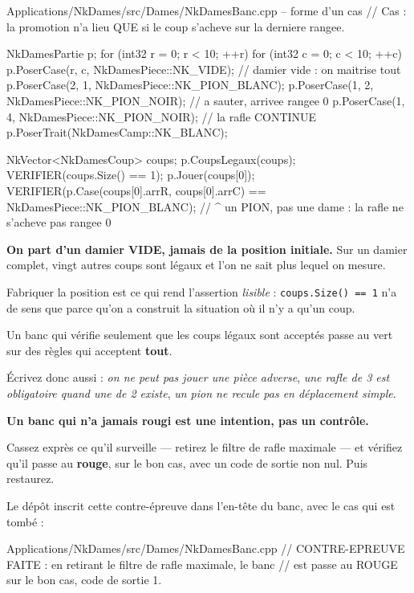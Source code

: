 \begin{nkcode}{Applications/NkDames/src/Dames/NkDamesBanc.cpp -- forme d'un cas}
// Cas : la promotion n'a lieu QUE si le coup s'acheve sur la derniere rangee.
{
    NkDamesPartie p;
    for (int32 r = 0; r < 10; ++r)
        for (int32 c = 0; c < 10; ++c)
            p.PoserCase(r, c, NkDamesPiece::NK_VIDE);   // damier vide : on maitrise tout
    p.PoserCase(2, 1, NkDamesPiece::NK_PION_BLANC);
    p.PoserCase(1, 2, NkDamesPiece::NK_PION_NOIR);      // a sauter, arrivee rangee 0
    p.PoserCase(1, 4, NkDamesPiece::NK_PION_NOIR);      // la rafle CONTINUE
    p.PoserTrait(NkDamesCamp::NK_BLANC);

    NkVector<NkDamesCoup> coups;
    p.CoupsLegaux(coups);
    VERIFIER(coups.Size() == 1);
    p.Jouer(coups[0]);
    VERIFIER(p.Case(coups[0].arrR, coups[0].arrC) == NkDamesPiece::NK_PION_BLANC);
    //        ^ un PION, pas une dame : la rafle ne s'acheve pas rangee 0
}
\end{nkcode}

\begin{nkretenir}
\textbf{On part d'un damier VIDE, jamais de la position initiale.} Sur un damier
complet, vingt autres coups sont légaux et l'on ne sait plus lequel on mesure.

Fabriquer la position est ce qui rend l'assertion \emph{lisible} :
\texttt{coups.Size() == 1} n'a de sens que parce qu'on a construit la situation
où il n'y a qu'un coup.
\end{nkretenir}

\begin{nkpiege}
Un banc qui vérifie seulement que les coups légaux sont acceptés passe au vert
sur des règles qui acceptent \textbf{tout}.

Écrivez donc aussi : \emph{on ne peut pas jouer une pièce adverse},
\emph{une rafle de 3 est obligatoire quand une de 2 existe},
\emph{un pion ne recule pas en déplacement simple}.
\end{nkpiege}

\begin{nkretenir}
\textbf{Un banc qui n'a jamais rougi est une intention, pas un contrôle.}

Cassez exprès ce qu'il surveille --- retirez le filtre de rafle maximale --- et
vérifiez qu'il passe au \textbf{rouge}, sur le bon cas, avec un code de sortie
non nul. Puis restaurez.

Le dépôt inscrit cette contre-épreuve dans l'en-tête du banc, avec le cas qui
est tombé :

\begin{nkcode}{Applications/NkDames/src/Dames/NkDamesBanc.cpp}
// CONTRE-EPREUVE FAITE : en retirant le filtre de rafle maximale, le banc
// est passe au ROUGE sur le bon cas, code de sortie 1.
\end{nkcode}
\end{nkretenir}


